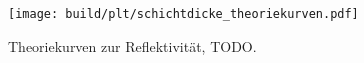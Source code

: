 \begin{figure}
    \centering
    \texttt{[image: build/plt/schichtdicke\_theoriekurven.pdf]}
    \caption{
        Theoriekurven zur Reflektivität, TODO.
    }
    \label{fig:plt:schichtdicke_c}
\end{figure}
